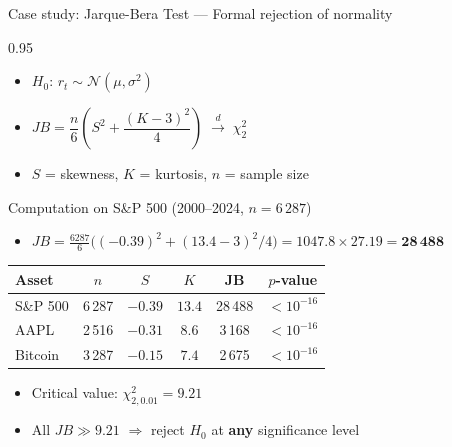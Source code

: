 \documentclass[9pt, aspectratio=169, t]{beamer}
\begin{document}
\begin{frame}[shrink=10]{Case study: Jarque-Bera Test --- Formal rejection of normality}
    \begin{cminipage}{0.95\textwidth}
    \begin{defn}
    \begin{itemize}\setlength{\itemsep}{0pt}
        \item $H_0$: $r_t \sim \mathcal{N}(\mu, \sigma^2)$
        \item $JB = \dfrac{n}{6}\!\left(S^2 + \dfrac{(K-3)^2}{4}\right) \;\xrightarrow{d}\; \chi^2_2$
        \item $S$ = skewness, $K$ = kurtosis, $n$ = sample size
    \end{itemize}
    \end{defn}
    \begin{exampleblock}{Computation on S\&P 500 (2000--2024, $n = 6\,287$)}
    \begin{itemize}\setlength{\itemsep}{0pt}
        \item $JB = \frac{6287}{6}\bigl((-0.39)^2 + (13.4 - 3)^2/4\bigr) = 1047.8 \times 27.19 = \mathbf{28\,488}$
    \end{itemize}
    \end{exampleblock}
    \begin{center}
    {\small\renewcommand{\arraystretch}{1.15}
    \begin{tabular}{lccccc}
    \toprule
    \textbf{Asset} & $n$ & $S$ & $K$ & \textbf{JB} & $p$\textbf{-value} \\
    \midrule
    S\&P 500 & 6\,287 & $-0.39$ & $13.4$ & 28\,488 & $< 10^{-16}$ \\
    AAPL     & 2\,516 & $-0.31$ & $8.6$  & 3\,168  & $< 10^{-16}$ \\
    Bitcoin  & 3\,287 & $-0.15$ & $7.4$  & 2\,675  & $< 10^{-16}$ \\
    \bottomrule
    \end{tabular}}
    \end{center}
    \begin{itemize}\setlength{\itemsep}{0pt}
        \item Critical value: $\chi^2_{2, 0.01} = 9.21$
        \item All $JB \gg 9.21$ $\Rightarrow$ reject $H_0$ at \textbf{any} significance level
    \end{itemize}
    \end{cminipage}
\end{frame}
\end{document}
